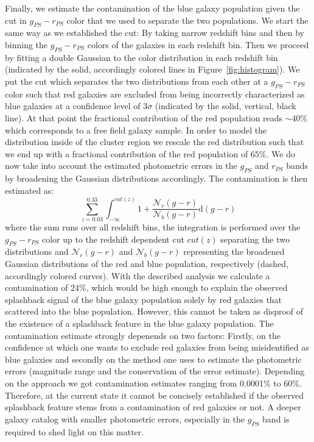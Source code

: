 \documentclass[iop, apjl, twocolappendix, numberedappendix]{emulateapj}
\begin{document}
Finally, we estimate the contamination of the blue galaxy population given the cut in $g_{PS} - r_{PS}$
color that we used to separate the two populations. We start the same way as we established the cut:
By taking narrow redshift bins and then by binning the $g_{PS} - r_{PS}$ colors of the galaxies in each
redshift bin. Then we proceed by fitting a double Gaussian to the color distribution in each redshift bin
(indicated by the solid, accordingly colored lines in Figure~\ref{fig:histogram}). We put the cut which
separates the two distributions from each other at a $g_{PS} - r_{PS}$ color such that red galaxies are
excluded from being incorrectly characterized as blue galaxies at a confidence level of $3\sigma$ (indicated
by the solid, vertical, black line). At that point the fractional contribution of the red population reads 
$\sim 40\%$ which corresponds to a free field galaxy sample. In order to model the distribution inside of 
the cluster region we rescale the red distribution such that we end up with a fractional contribution of 
the red population of $65\%$. We do now take into account the estimated photometric errors in the $g_{PS}$ and
$r_{PS}$ bands by broadening the Gaussian distributions accordingly. The contamination is then estimated as:
\begin{equation}
\sum_{z=0.03}^{0.33} \int_{-\infty}^{cut(z)} 1 + \frac{\mathcal{N}_r(g-r)}{\mathcal{N}_b(g-r)} \mathrm{d}(g-r)
\end{equation}
where the sum runs over all redshift bins, the integration is performed over the $g_{PS} - r_{PS}$ color up 
to the redshift dependent cut $cut(z)$ separating the two distributions and $\mathcal{N}_r(g-r)$ and $\mathcal{N}_b(g-r)$
representing the broadened Gaussian distributions of the red and blue population, respectively
(dashed, accordingly colored curves). With the described analysis we calculate a contamination of 24\%, which would
be high enough to explain the observed splashback signal of the blue galaxy population solely by red galaxies
that scattered into the blue population. However, this cannot be taken as disproof of the existence of a splashback
feature in the blue galaxy population. The contamination estimate strongly depenends on two factors: Firstly, on the 
confidence at which one wants to exclude red galaxies from being misidentified as blue galaxies and secondly on the
method one uses to estimate the photometric errors (magnitude range and the conservatism of the error estimate).
Depending on the approach we got contamination estimates ranging from 0.0001\% to 60\%. Therefore, at the current
state it cannot be concisely established if the observed splashback feature stems from a contamination of red
galaxies or not. A deeper galaxy catalog with smaller photometric errors, especially in the $g_{PS}$ band is
required to shed light on this matter.
\end{document}
